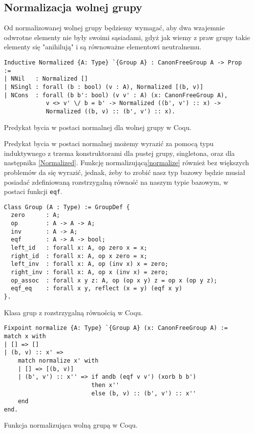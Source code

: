 \subsection{Normalizacja wolnej grupy}
Od normalizowanej wolnej grupy będziemy wymagać, aby dwa wzajemnie odwrotne elementy nie były swoimi sąsiadami, gdyż jak wiemy z praw grupy takie elementy się "anihilują" i są równoważne elementowi neutralnemu. 
\begin{code}
\begin{verbatim}
Inductive Normalized {A: Type} `{Group A} : CanonFreeGroup A -> Prop :=
| NNil   : Normalized []
| NSingl : forall (b : bool) (v : A), Normalized [(b, v)]
| NCons  : forall (b b': bool) (v v' : A) (x: CanonFreeGroup A), 
            v <> v' \/ b = b' -> Normalized ((b', v') :: x) ->
            Normalized ((b, v) :: (b', v') :: x).
\end{verbatim}
\caption{Predykat bycia w postaci normalnej dla wolnej grupy w Coqu.}
\label{Normalized}
\end{code}
Predykat bycia w postaci normalnej możemy wyrazić za pomocą typu induktywnego z trzema konstruktorami dla pustej grupy, singletona, oraz dla następnika \ref{Normalized}. Funkcję normalizującą\ref{normalize} również bez większych problemów da się wyrazić, jednak, żeby to zrobić nasz typ bazowy będzie musiał posiadać zdefiniowaną rozstrzygalną równość na naszym typie bazowym, w postaci funkcji \texttt{eqf}.
\begin{code}
\begin{verbatim}
Class Group (A : Type) := GroupDef {
  zero      : A;
  op        : A -> A -> A;
  inv       : A -> A;
  eqf       : A -> A -> bool;
  left_id   : forall x: A, op zero x = x;
  right_id  : forall x: A, op x zero = x;
  left_inv  : forall x: A, op (inv x) x = zero;
  right_inv : forall x: A, op x (inv x) = zero;
  op_assoc  : forall x y z: A, op (op x y) z = op x (op y z);
  eqf_eq    : forall x y, reflect (x = y) (eqf x y)
}.
\end{verbatim}
\caption{Klasa grup z rozstrzygalną równością w Coqu.}
\label{normalize}
\end{code}

\begin{code}
\begin{verbatim}
Fixpoint normalize {A: Type} `{Group A} (x: CanonFreeGroup A) :=
match x with
| [] => []
| (b, v) :: x' => 
    match normalize x' with
    | [] => [(b, v)]
    | (b', v') :: x'' => if andb (eqf v v') (xorb b b')
                         then x''
                         else (b, v) :: (b', v') :: x''
    end
end.
\end{verbatim}
\caption{Funkcja normalizująca wolną grupą w Coqu.}
\label{normalize}
\end{code}
